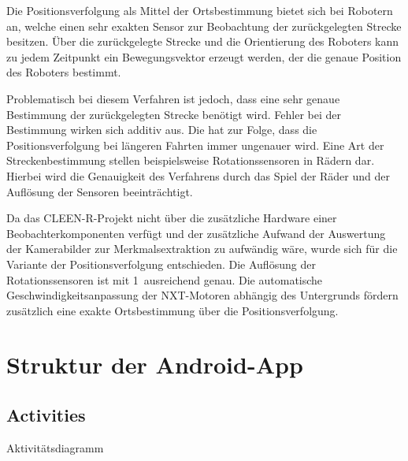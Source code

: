 Die Positionsverfolgung als Mittel der Ortsbestimmung bietet sich bei Robotern an, welche einen sehr exakten Sensor zur Beobachtung der zurückgelegten Strecke besitzen. Über die zurückgelegte Strecke und die Orientierung des Roboters kann zu jedem Zeitpunkt ein Bewegungsvektor erzeugt werden, der die genaue Position des Roboters bestimmt.

Problematisch bei diesem Verfahren ist jedoch, dass eine sehr genaue Bestimmung der zurückgelegten Strecke benötigt wird. Fehler bei der Bestimmung wirken sich additiv aus. Die hat zur Folge, dass die Positionsverfolgung bei längeren Fahrten immer ungenauer wird. Eine Art der Streckenbestimmung stellen beispielsweise Rotationssensoren in Rädern dar. Hierbei wird die Genauigkeit des Verfahrens durch das Spiel der Räder und der Auflösung der Sensoren beeinträchtigt.

Da das CLEEN-R-Projekt nicht über die zusätzliche Hardware einer Beobachterkomponenten verfügt und der zusätzliche Aufwand der Auswertung der Kamerabilder zur Merkmalsextraktion zu aufwändig wäre, wurde sich für die Variante der Positionsverfolgung entschieden. Die Auflösung der Rotationssensoren ist mit 1\degree\ ausreichend genau. Die automatische Geschwindigkeitsanpassung der NXT-Motoren abhängig des Untergrunds fördern zusätzlich eine exakte Ortsbestimmung über die Positionsverfolgung.

\section{Struktur der Android-App}
\subsection{Activities}
Aktivitätsdiagramm






